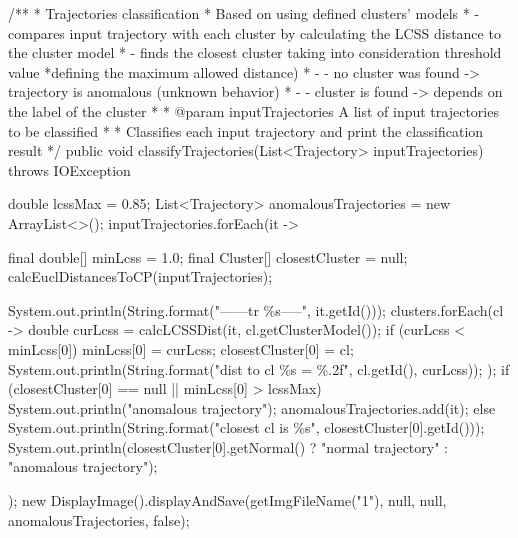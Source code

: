     /**
     * Trajectories classification
     * Based on using defined clusters' models
     * - compares input trajectory with each cluster by calculating the LCSS distance to the cluster model
     * - finds the closest cluster taking into consideration threshold value *defining the maximum allowed distance)
     * - - no cluster was found -> trajectory is anomalous (unknown behavior)
     * - - cluster is found -> depends on the label of the cluster
     *
     * @param inputTrajectories A list of input trajectories to be classified
     *
     * Classifies each input trajectory and print the classification result
     */
    public void classifyTrajectories(List<Trajectory> inputTrajectories) throws IOException {
        double lcssMax = 0.85;
        List<Trajectory> anomalousTrajectories = new ArrayList<>();
        inputTrajectories.forEach(it -> {
            final double[] minLcss = {1.0};
            final Cluster[] closestCluster = {null};
            calcEuclDistancesToCP(inputTrajectories);

            System.out.println(String.format("------tr \%s-----", it.getId()));
            clusters.forEach(cl -> {
                double curLcss = calcLCSSDist(it, cl.getClusterModel());
                if (curLcss < minLcss[0]) {
                    minLcss[0] = curLcss;
                    closestCluster[0] = cl;
                }
                System.out.println(String.format("dist to cl \%s = \%.2f", cl.getId(), curLcss));
            });
            if (closestCluster[0] == null || minLcss[0] > lcssMax) {
                System.out.println("anomalous trajectory");
                anomalousTrajectories.add(it);
            } else {
                System.out.println(String.format("closest cl is \%s", closestCluster[0].getId()));
                System.out.println(closestCluster[0].getNormal() ? "normal trajectory" : "anomalous trajectory");
            }
        });
        new DisplayImage().displayAndSave(getImgFileName("1"), null, null, anomalousTrajectories, false);
    }
